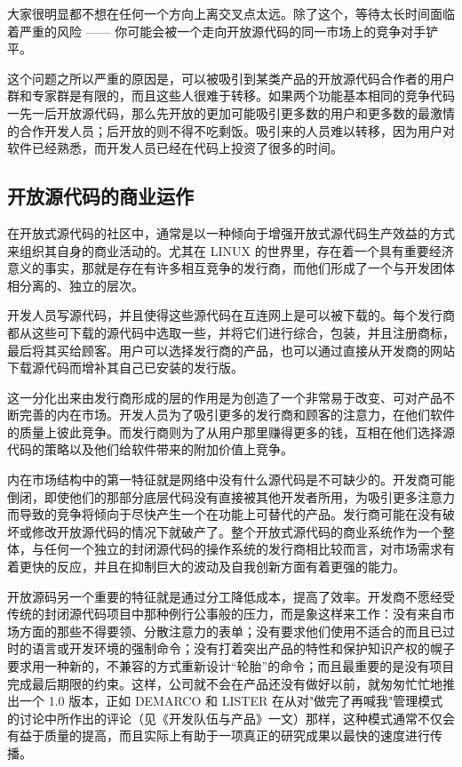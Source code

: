 大家很明显都不想在任何一个方向上离交叉点太远。除了这个，等待太长时间面临着严重的风险 —— 你可能会被一个走向开放源代码的同一市场上的竞争对手铲平。


这个问题之所以严重的原因是，可以被吸引到某类产品的开放源代码合作者的用户群和专家群是有限的，而且这些人很难于转移。如果两个功能基本相同的竞争代码一先一后开放源代码，那么先开放的更加可能吸引更多数的用户和更多数的最激情的合作开发人员；后开放的则不得不吃剩饭。吸引来的人员难以转移，因为用户对软件已经熟悉，而开发人员已经在代码上投资了很多的时间。


\subsection{开放源代码的商业运作}
在开放式源代码的社区中，通常是以一种倾向于增强开放式源代码生产效益的方式来组织其自身的商业活动的。尤其在 LINUX 的世界里，存在着一个具有重要经济意义的事实，那就是存在有许多相互竞争的发行商，而他们形成了一个与开发团体相分离的、独立的层次。


开发人员写源代码，并且使得这些源代码在互连网上是可以被下载的。每个发行商都从这些可下载的源代码中选取一些，并将它们进行综合，包装，并且注册商标，最后将其买给顾客。用户可以选择发行商的产品，也可以通过直接从开发商的网站下载源代码而增补其自己已安装的发行版。


这一分化出来由发行商形成的层的作用是为创造了一个非常易于改变、可对产品不断完善的内在市场。开发人员为了吸引更多的发行商和顾客的注意力，在他们软件的质量上彼此竞争。而发行商则为了从用户那里赚得更多的钱，互相在他们选择源代码的策略以及他们给软件带来的附加价值上竞争。


内在市场结构中的第一特征就是网络中没有什么源代码是不可缺少的。开发商可能倒闭，即使他们的那部分底层代码没有直接被其他开发者所用，为吸引更多注意力而导致的竞争将倾向于尽快产生一个在功能上可替代的产品。发行商可能在没有破坏或修改开放源代码的情况下就破产了。整个开放式源代码的商业系统作为一个整体，与任何一个独立的封闭源代码的操作系统的发行商相比较而言，对市场需求有着更快的反应，并且在抑制巨大的波动及自我创新方面有着更强的能力。


开放源码另一个重要的特征就是通过分工降低成本，提高了效率。开发商不愿经受传统的封闭源代码项目中那种例行公事般的压力，而是象这样来工作：没有来自市场方面的那些不得要领、分散注意力的表单；没有要求他们使用不适合的而且已过时的语言或开发环境的强制命令；没有打着突出产品的特性和保护知识产权的幌子要求用一种新的，不兼容的方式重新设计“轮胎”的命令；而且最重要的是没有项目完成最后期限的约束。这样，公司就不会在产品还没有做好以前，就匆匆忙忙地推出一个 1.0 版本，正如 DEMARCO 和 LISTER 在从对"做完了再喊我"管理模式的讨论中所作出的评论（见《开发队伍与产品》一文）那样，这种模式通常不仅会有益于质量的提高，而且实际上有助于一项真正的研究成果以最快的速度进行传播。


